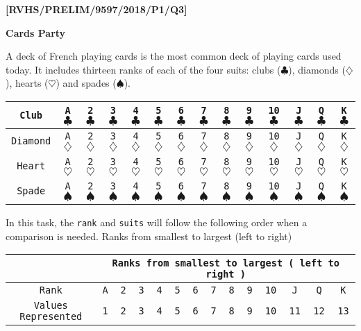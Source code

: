 \item \textbf{{[}RVHS/PRELIM/9597/2018/P1/Q3{]} }

\textbf{Cards Party}

A deck of French playing cards is the most common deck of playing
cards used today. It includes thirteen ranks of each of the four suits:
clubs ($\clubsuit$), diamonds ($\diamondsuit$), hearts ($\heartsuit$)
and spades ($\spadesuit$).
\noindent \begin{center}
\begin{tabular}{|c|c|c|c|c|c|c|c|c|c|c|c|c|c|}
\hline 
\texttt{Club} & \texttt{A$\clubsuit$} & \texttt{2$\clubsuit$} & \texttt{3$\clubsuit$} & \texttt{4$\clubsuit$} & \texttt{5$\clubsuit$} & \texttt{6$\clubsuit$} & \texttt{7$\clubsuit$} & \texttt{8$\clubsuit$} & \texttt{9$\clubsuit$} & \texttt{10$\clubsuit$} & \texttt{J$\clubsuit$} & \texttt{Q$\clubsuit$} & \texttt{K$\clubsuit$}\tabularnewline
\hline 
\texttt{Diamond} & \texttt{A$\diamondsuit$} & \texttt{2$\diamondsuit$} & \texttt{3$\diamondsuit$} & \texttt{4$\diamondsuit$} & \texttt{5$\diamondsuit$} & \texttt{6$\diamondsuit$} & \texttt{7$\diamondsuit$} & \texttt{8$\diamondsuit$} & \texttt{9$\diamondsuit$} & \texttt{10$\diamondsuit$} & \texttt{J$\diamondsuit$} & \texttt{Q$\diamondsuit$} & \texttt{K$\diamondsuit$}\tabularnewline
\hline 
\texttt{Heart} & \texttt{A$\heartsuit$} & \texttt{2$\heartsuit$} & \texttt{3$\heartsuit$} & \texttt{4$\heartsuit$} & \texttt{5$\heartsuit$} & \texttt{6$\heartsuit$} & \texttt{7$\heartsuit$} & \texttt{8$\heartsuit$} & \texttt{9$\heartsuit$} & \texttt{10$\heartsuit$} & \texttt{J$\heartsuit$} & \texttt{Q$\heartsuit$} & \texttt{K$\heartsuit$}\tabularnewline
\hline 
\texttt{Spade} & \texttt{A$\spadesuit$} & \texttt{2$\spadesuit$} & \texttt{3$\spadesuit$} & \texttt{4$\spadesuit$} & \texttt{5$\spadesuit$} & \texttt{6$\spadesuit$} & \texttt{7$\spadesuit$} & \texttt{8$\spadesuit$} & \texttt{9$\spadesuit$} & \texttt{10$\spadesuit$} & \texttt{J$\spadesuit$} & \texttt{Q$\spadesuit$} & \texttt{K$\spadesuit$}\tabularnewline
\hline 
\end{tabular} 
\par\end{center}

In this task, the \texttt{rank} and \texttt{suits} will follow the
following order when a comparison is needed. Ranks from smallest to
largest (left to right)
\begin{center}
\begin{tabular}{|c|c|c|c|c|c|c|c|c|c|c|c|c|c|}
\hline 
 & \multicolumn{13}{c|}{\texttt{\textbf{Ranks from smallest to largest ( left to right )}}}\tabularnewline
\hline 
\texttt{Rank} & \texttt{A} & \texttt{2} & \texttt{3} & \texttt{4} & \texttt{5} & \texttt{6} & \texttt{7} & \texttt{8} & \texttt{9} & \texttt{10} & \texttt{J} & \texttt{Q} & \texttt{K}\tabularnewline
\hline 
\texttt{Values Represented} & \texttt{1} & \texttt{2} & \texttt{3} & \texttt{4} & \texttt{5} & \texttt{6} & \texttt{7} & \texttt{8} & \texttt{9} & \texttt{10} & \texttt{11} & \texttt{12} & \texttt{13}\tabularnewline
\hline 
\end{tabular}
\par\end{center}

